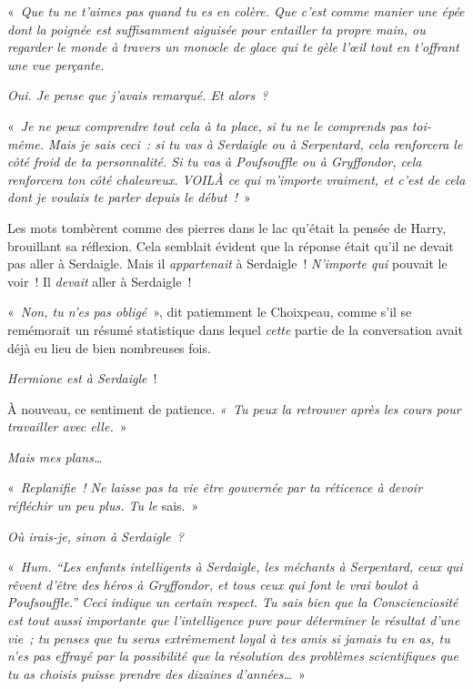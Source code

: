 «~\emph{Que tu ne t'aimes pas quand tu es en colère.
Que c'est comme manier une épée dont la poignée est suffisamment aiguisée pour entailler ta propre main, ou regarder le monde à travers un monocle de glace qui te gèle l'œil tout en t'offrant une vue perçante.}

\emph{Oui. Je pense que j'avais remarqué. Et alors~?}

«~\emph{Je ne peux comprendre tout cela à ta place, si tu ne le comprends pas toi-même.
Mais je sais ceci~: si tu vas à Serdaigle ou à Serpentard, cela renforcera le côté froid de ta personnalité.
Si tu vas à Poufsouffle ou à Gryffondor, cela renforcera ton côté chaleureux.
VOILÀ ce qui m'importe vraiment, et c'est de cela dont je voulais te parler depuis le début~!}~»

Les mots tombèrent comme des pierres dans le lac qu'était la pensée de Harry, brouillant sa réflexion.
Cela semblait évident que la réponse était qu'il ne devait pas aller à Serdaigle.
Mais il \emph{appartenait} à Serdaigle~!
\emph{N'importe qui} pouvait le voir~!
Il \emph{devait} aller à Serdaigle~!

«~\emph{Non, tu n'es pas obligé}~», dit patiemment le Choixpeau, comme s'il se remémorait un résumé statistique dans lequel \emph{cette} partie de la conversation avait déjà eu lieu de bien nombreuses fois.

\emph{Hermione est à Serdaigle}~!

À nouveau, ce sentiment de patience. \emph{«~Tu peux la retrouver après les cours pour travailler avec elle.}~»

\emph{Mais mes plans…}

«~\emph{Replanifie~! Ne laisse pas ta vie être gouvernée par ta réticence à devoir réfléchir un peu plus. Tu le} sais.~»

\emph{Où irais-je, sinon à Serdaigle~?}

«~\emph{Hum. “Les enfants intelligents à Serdaigle, les méchants à Serpentard, ceux qui rêvent d'être des héros à Gryffondor, et tous ceux qui font le vrai boulot à Poufsouffle.”
Ceci indique un certain respect.
Tu sais bien que la Conscienciosité est tout aussi importante que l'intelligence pure pour déterminer le résultat d'une vie~;
tu penses que tu seras extrêmement loyal à tes amis si jamais tu en as, tu n'es pas effrayé par la possibilité que la résolution des problèmes scientifiques que tu as choisis puisse prendre des dizaines d'années…}~»

